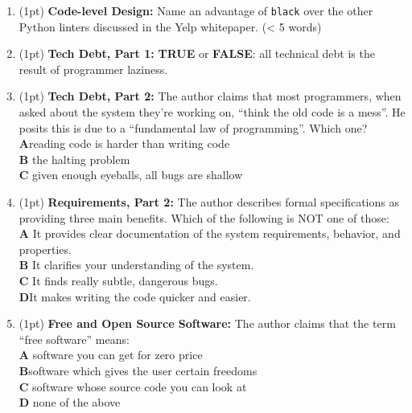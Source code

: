 \documentclass{article}
\newif\ifkey
\newcommand{\correct}[1]{\ifkey\color{red}\textbf{#1}\color{black}\else\textbf{#1}\fi\xspace}
\newcommand{\answershort}[1]{\ifkey\color{red}\underline{\textbf{#1}}\color{black}\else\underline{\hspace{3in}}\fi\xspace}
\newcommand*{\pts}[1]{\addtocounter{points}{#1}(#1pt)}
\begin{document}
\begin{spacing}{1.4}
\begin{enumerate}[leftmargin=*]
\item \pts{1}
  \textbf{Code-level Design:} Name an advantage of \texttt{black} over the other Python linters discussed in the Yelp whitepaper. (< 5 words)
  \\ \answershort{any of: opinionated; resolves errors automatically; consistency}

\item \pts{1}
  \textbf{Tech Debt, Part 1:} \textbf{TRUE} or \correct{FALSE}:
  all technical debt is the result of programmer laziness.

\item \pts{1}
  \textbf{Tech Debt, Part 2:}
  The author claims that most programmers, when asked about the system they’re working on, “think the old code is a mess”. He posits this is due to a “fundamental law of programming”. Which one?
  \\ \correct{A}\hspace{0.2in}reading code is harder than writing code
  \\ \textbf{B}\hspace{0.2in} the halting problem
  \\ \textbf{C}\hspace{0.2in} given enough eyeballs, all bugs are shallow

\item \pts{1}
  \textbf{Requirements, Part 2:}
  The author describes formal specifications as providing three main benefits. Which of the following is NOT one of those:
  \\ \textbf{A}\hspace{0.2in} It provides clear documentation of the system requirements, behavior, and properties.
  \\ \textbf{B}\hspace{0.2in} It clarifies your understanding of the system.
  \\ \textbf{C}\hspace{0.2in} It finds really subtle, dangerous bugs.
  \\ \correct{D}\hspace{0.2in}It makes writing the code quicker and easier.

\item \pts{1}
  \textbf{Free and Open Source Software:}
  The author claims that the term “free software” means:
  \\ \textbf{A}\hspace{0.2in} software you can get for zero price
  \\ \correct{B}\hspace{0.2in}software which gives the user certain freedoms
  \\ \textbf{C}\hspace{0.2in} software whose source code you can look at
  \\ \textbf{D}\hspace{0.2in} none of the above


\end{enumerate}
\end{spacing}
\end{document}
